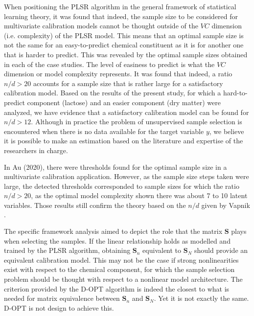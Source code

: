 \documentclass[journal=ancham,manuscript=article]{achemso}
\begin{document}
When positioning the PLSR algorithm in the general framework of statistical learning theory, it was found that indeed, the sample size to be considered for multivariate calibration models cannot be thought outside of the $VC$ dimension (i.e. complexity) of the PLSR model. This means that an optimal sample size is not the same for an easy-to-predict chemical constituent as it is for another one that is harder to predict. This was revealed by the optimal sample sizes obtained in each of the case studies. The level of easiness to predict is what the $VC$ dimension or model complexity represents. It was found that indeed, a ratio $n/d>20$ accounts for a sample size that is rather large for a satisfactory calibration model. Based on the results of the present study, for which a hard-to-predict component (lactose) and an easier component (dry matter) were analyzed, we have evidence that a satisfactory calibration model can be found for $n/d>12$. Although in practice the problem of unsupervised sample selection is encountered when there is no data available for the target variable $y$, we believe it is possible to make an estimation based on the literature and expertise of the researchers in charge.

In Au (2020)\cite{Au2020}, there were thresholds found for the optimal sample size in a multivariate calibration application. However, as the sample size steps taken were large, the detected thresholds corresponded to sample sizes for which the ratio $n/d>20$, as the optimal model complexity shown there was about 7 to 10 latent variables. Those results still confirm the theory based on the $n/d$ given by Vapnik \cite{Vapnik2000}.

The specific framework analysis aimed to depict the role that the matrix $\mathbf{S}$ plays when selecting the samples. If the linear relationship holds as modelled and trained by the PLSR algorithm, obtaining $\mathbf{S}_n$ equivalent to $\mathbf{S}_N$ should provide an equivalent calibration model. This may not be the case if strong nonlinearities exist with respect to the chemical component, for which the sample selection problem should be thought with respect to a nonlinear model architecture. The criterion provided by the D-OPT algorithm is indeed the closest to what is needed for matrix equivalence between $\mathbf{S}_n$ and $\mathbf{S}_N$. Yet it is not exactly the same. D-OPT is not design to achieve this.
\end{document}
